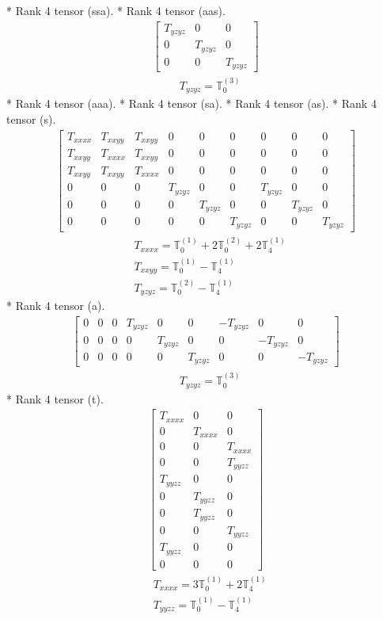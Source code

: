 \documentclass[fleqn,8pt,landscape]{jsarticle}
\begin{document}
* Rank 4 tensor (ssa).
* Rank 4 tensor (aas).
\begin{align*}
\begin{bmatrix} T_{yzyz} & 0 & 0 \\ 0 & T_{yzyz} & 0 \\ 0 & 0 & T_{yzyz} \end{bmatrix}
\end{align*}
\begin{align*}
& T_{yzyz} = \mathbb{T}_{0}^{(3)}
\end{align*}
* Rank 4 tensor (aaa).
* Rank 4 tensor (sa).
* Rank 4 tensor (as).
* Rank 4 tensor (s).
\begin{align*}
\begin{bmatrix} T_{xxxx} & T_{xxyy} & T_{xxyy} & 0 & 0 & 0 & 0 & 0 & 0 \\ T_{xxyy} & T_{xxxx} & T_{xxyy} & 0 & 0 & 0 & 0 & 0 & 0 \\ T_{xxyy} & T_{xxyy} & T_{xxxx} & 0 & 0 & 0 & 0 & 0 & 0 \\ 0 & 0 & 0 & T_{yzyz} & 0 & 0 & T_{yzyz} & 0 & 0 \\ 0 & 0 & 0 & 0 & T_{yzyz} & 0 & 0 & T_{yzyz} & 0 \\ 0 & 0 & 0 & 0 & 0 & T_{yzyz} & 0 & 0 & T_{yzyz} \end{bmatrix}
\end{align*}
\begin{align*}
& T_{xxxx} = \mathbb{T}_{0}^{(1)} + 2 \mathbb{T}_{0}^{(2)} + 2 \mathbb{T}_{4}^{(1)} \\
& T_{xxyy} = \mathbb{T}_{0}^{(1)} - \mathbb{T}_{4}^{(1)} \\
& T_{yzyz} = \mathbb{T}_{0}^{(2)} - \mathbb{T}_{4}^{(1)}
\end{align*}
* Rank 4 tensor (a).
\begin{align*}
\begin{bmatrix} 0 & 0 & 0 & T_{yzyz} & 0 & 0 & - T_{yzyz} & 0 & 0 \\ 0 & 0 & 0 & 0 & T_{yzyz} & 0 & 0 & - T_{yzyz} & 0 \\ 0 & 0 & 0 & 0 & 0 & T_{yzyz} & 0 & 0 & - T_{yzyz} \end{bmatrix}
\end{align*}
\begin{align*}
& T_{yzyz} = \mathbb{T}_{0}^{(3)}
\end{align*}
* Rank 4 tensor (t).
\begin{align*}
\begin{bmatrix} T_{xxxx} & 0 & 0 \\ 0 & T_{xxxx} & 0 \\ 0 & 0 & T_{xxxx} \\ 0 & 0 & T_{yyzz} \\ T_{yyzz} & 0 & 0 \\ 0 & T_{yyzz} & 0 \\ 0 & T_{yyzz} & 0 \\ 0 & 0 & T_{yyzz} \\ T_{yyzz} & 0 & 0 \\ 0 & 0 & 0 \end{bmatrix}
\end{align*}
\begin{align*}
& T_{xxxx} = 3 \mathbb{T}_{0}^{(1)} + 2 \mathbb{T}_{4}^{(1)} \\
& T_{yyzz} = \mathbb{T}_{0}^{(1)} - \mathbb{T}_{4}^{(1)}
\end{align*}
\end{document}
